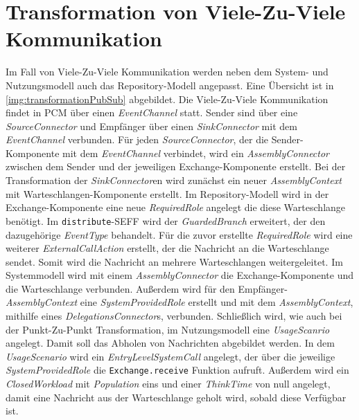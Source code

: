 \section{Transformation von Viele-Zu-Viele Kommunikation}
Im Fall von Viele-Zu-Viele Kommunikation werden neben dem System- und Nutzungsmodell auch das Repository-Modell angepasst. Eine Übersicht ist in \autoref{img:transformationPubSub} abgebildet. Die Viele-Zu-Viele Kommunikation findet in PCM über einen \emph{EventChannel} statt. Sender sind über eine \emph{SourceConnector} und Empfänger über einen \emph{SinkConnector} mit dem \emph{EventChannel} verbunden. Für jeden \emph{SourceConnector}, der die Sender-Komponente mit dem \emph{EventChannel} verbindet, wird ein \emph{AssemblyConnector} zwischen dem Sender und der jeweiligen Exchange-Komponente erstellt. Bei der Transformation der \emph{SinkConnector}en wird zunächst ein neuer \emph{AssemblyContext} mit Warteschlangen-Komponente erstellt. Im Repository-Modell wird in der Exchange-Komponente eine neue \emph{RequiredRole} angelegt die diese Warteschlange benötigt. Im \texttt{distribute}-SEFF wird der \emph{GuardedBranch} erweitert, der den dazugehörige \emph{EventType} behandelt. Für die zuvor erstellte \emph{RequiredRole} wird eine weiterer \emph{ExternalCallAction} erstellt, der die Nachricht an die Warteschlange sendet. Somit wird die Nachricht an mehrere Warteschlangen weitergeleitet. Im Systemmodell wird mit einem \emph{AssemblyConnector} die Exchange-Komponente und die Warteschlange verbunden. Außerdem wird für den Empfänger-\emph{AssemblyContext} eine \emph{SystemProvidedRole} erstellt und mit dem \emph{AssemblyContext}, mithilfe eines \emph{DelegationsConnector}s, verbunden. Schließlich wird, wie auch bei der Punkt-Zu-Punkt Transformation, im Nutzungsmodell eine \emph{UsageScanrio} angelegt. Damit soll das Abholen von Nachrichten abgebildet werden. In dem \emph{UsageScenario} wird ein \emph{EntryLevelSystemCall} angelegt, der über die jeweilige \emph{SystemProvidedRole} die \texttt{Exchange.receive} Funktion aufruft. Außerdem wird ein \emph{ClosedWorkload} mit \emph{Population} eins und einer \emph{ThinkTime} von null angelegt, damit eine Nachricht aus der Warteschlange geholt wird, sobald diese Verfügbar ist.

